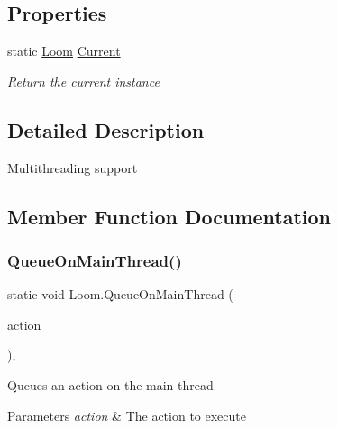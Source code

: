 \subsection*{Properties}
\begin{DoxyCompactItemize}
\item 
static \hyperlink{class_loom}{Loom} \hyperlink{class_loom_a755c2c53122fe9c9a7447699f6fa27b8}{Current}
\begin{DoxyCompactList}\small\item\em Return the current instance \end{DoxyCompactList}\end{DoxyCompactItemize}


\subsection{Detailed Description}
Multithreading support 



\subsection{Member Function Documentation}
\mbox{\label{class_loom_a0d38a65c449aacb444a14074f3d62574}} 
\subsubsection{\texorpdfstring{Queue\+On\+Main\+Thread()}{QueueOnMainThread()}\hspace{0.1cm}{\footnotesize\ttfamily [1/2]}}
{\footnotesize\ttfamily static void Loom.\+Queue\+On\+Main\+Thread (\begin{DoxyParamCaption}\item[{Action}]{action }\end{DoxyParamCaption})\hspace{0.3cm}{\ttfamily [inline]}, {\ttfamily [static]}}



Queues an action on the main thread 


\begin{DoxyParams}{Parameters}
{\em action} & The action to execute \\
\hline
\end{DoxyParams}
\mbox{\label{class_loom_a9003659e5b32d18ddb3c9204dcff343f}} 
